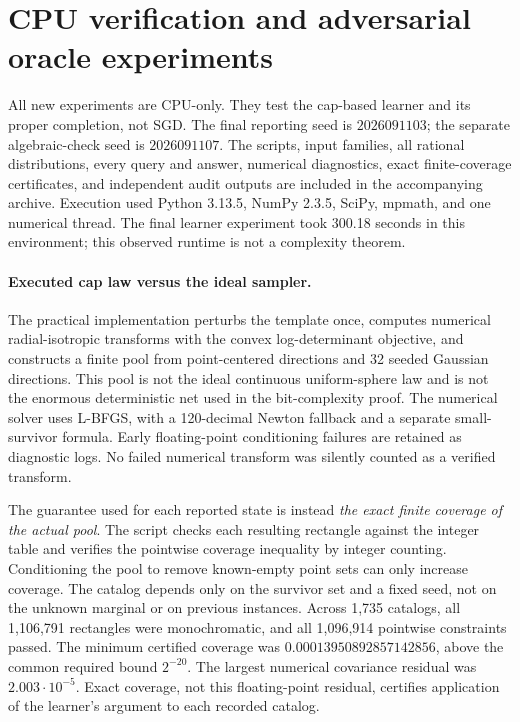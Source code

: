 \section{CPU verification and adversarial oracle experiments}\label{app:verification}
All new experiments are CPU-only. They test the cap-based learner and its proper completion, not SGD. The final reporting seed is $2026091103$; the separate algebraic-check seed is $2026091107$. The scripts, input families, all rational distributions, every query and answer, numerical diagnostics, exact finite-coverage certificates, and independent audit outputs are included in the accompanying archive. Execution used Python 3.13.5, NumPy 2.3.5, SciPy, mpmath, and one numerical thread. The final learner experiment took 300.18 seconds in this environment; this observed runtime is not a complexity theorem.

\paragraph{Executed cap law versus the ideal sampler.}
The practical implementation perturbs the template once, computes numerical radial-isotropic transforms with the convex log-determinant objective, and constructs a finite pool from point-centered directions and 32 seeded Gaussian directions. This pool is not the ideal continuous uniform-sphere law and is not the enormous deterministic net used in the bit-complexity proof. The numerical solver uses L-BFGS, with a 120-decimal Newton fallback and a separate small-survivor formula. Early floating-point conditioning failures are retained as diagnostic logs. No failed numerical transform was silently counted as a verified transform.

The guarantee used for each reported state is instead \emph{the exact finite coverage of the actual pool}. The script checks each resulting rectangle against the integer table and verifies the pointwise coverage inequality by integer counting. Conditioning the pool to remove known-empty point sets can only increase coverage. The catalog depends only on the survivor set and a fixed seed, not on the unknown marginal or on previous instances. Across 1,735 catalogs, all 1,106,791 rectangles were monochromatic, and all 1,096,914 pointwise constraints passed. The minimum certified coverage was $0.00013950892857142856$, above the common required bound $2^{-20}$. The largest numerical covariance residual was $2.003\cdot10^{-5}$. Exact coverage, not this floating-point residual, certifies application of the learner's argument to each recorded catalog.

